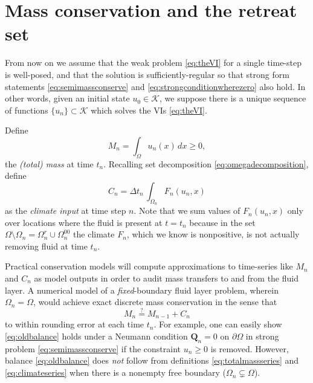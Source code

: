 \documentclass[final,onefignum]{siamart190516}
\newcommand\bQ{\mathbf{Q}}
\begin{document}
\section{Mass conservation and the retreat set}  \label{sec:timeseries}

From now on we assume that the weak problem \eqref{eq:theVI} for a single time-step is well-posed, and that the solution is sufficiently-regular so that strong form statements \eqref{eq:semimassconserve} and \eqref{eq:strongconditionwherezero} also hold.  In other words, given an initial state $u_0\in\mathcal{K}$, we suppose there is a unique sequence of functions $\{u_n\} \subset \mathcal{K}$ which solves the VIs \eqref{eq:theVI}.

Define
\begin{equation}
M_n = \int_\Omega u_n(x)\,dx \ge 0, \label{eq:totalmassseries}
\end{equation}
the \emph{(total) mass} at time $t_n$.  Recalling set decomposition \eqref{eq:omegadecomposition}, define
\begin{equation}
C_n = \Delta t_n\, \int_{\Omega_n} F_n(u_n,x) \label{eq:climateseries}
\end{equation}
as the \emph{climate input} at time step $n$.  Note that we sum values of $F_n(u_n,x)$ only over locations where the fluid is present at $t=t_n$ because in the set $\Omega \setminus \Omega_n = \Omega_n^r \cup \Omega_n^{00}$ the climate $F_n$, which we know is nonpositive, is not actually removing fluid at time $t_n$.

Practical conservation models will compute approximations to time-series like $M_n$ and $C_n$ as model outputs in order to audit mass transfers to and from the fluid layer.  A numerical model of a \emph{fixed}-boundary fluid layer problem, wherein $\Omega_n=\Omega$, would achieve exact discrete mass conservation in the sense that
\begin{equation}
M_n \stackrel{?}{=} M_{n-1} + C_n \label{eq:oldbalance}
\end{equation}
to within rounding error at each time $t_n$.  For example, one can easily show \eqref{eq:oldbalance} holds under a Neumann condition $\bQ_n=0$ on $\partial \Omega$ in strong problem \eqref{eq:semimassconserve} if the constraint $u_n\ge 0$ is removed.  However, balance \eqref{eq:oldbalance} does \emph{not} follow from definitions \eqref{eq:totalmassseries} and \eqref{eq:climateseries} when there is a nonempty free boundary ($\Omega_n \subsetneq \Omega$).
\end{document}

